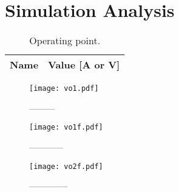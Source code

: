 \section{Simulation Analysis}
\label{sec:simulation}

\begin{table}[H]
  \centering
  \begin{tabular}{|l|r|}
    \hline    
    {\bf Name} & {\bf Value [A or V]} \\ \hline
    
  \end{tabular}
  \caption{Operating point.}
  \label{tab:op}
\end{table}

\begin{figure}[H] \centering
  \texttt{[image: vo1.pdf]}
  \caption{---------}
  \label{fig:acm}
  \end{figure}


  \begin{figure}[H] \centering
    \texttt{[image: vo1f.pdf]}
    \caption{------------}
    \label{fig:acm}
    \end{figure}


    \begin{figure}[H] \centering
      \texttt{[image: vo2f.pdf]}
      \caption{--------------}
      \label{fig:acm}
      \end{figure}
